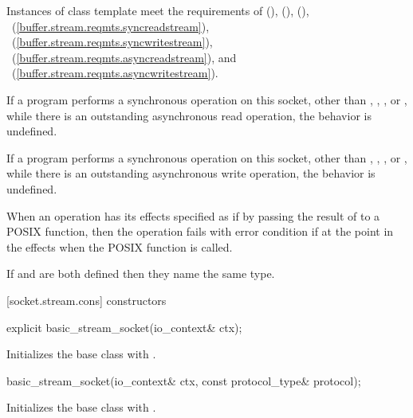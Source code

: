 \pnum
Instances of class template  meet the requirements of  (),  (),  (), ~(\ref{buffer.stream.reqmts.syncreadstream}), ~(\ref{buffer.stream.reqmts.syncwritestream}), ~(\ref{buffer.stream.reqmts.asyncreadstream}), and ~(\ref{buffer.stream.reqmts.asyncwritestream}).

\pnum
If a program performs a synchronous operation on this socket, other than , , , or , while there is an outstanding asynchronous read operation, the behavior is undefined.

\pnum
If a program performs a synchronous operation on this socket, other than , , , or , while there is an outstanding asynchronous write operation, the behavior is undefined.

\pnum
When an operation has its effects specified as if by passing the result of  to a POSIX function, then the operation fails with error condition  if  at the point in the effects when the POSIX function is called.

\pnum
If  and 
are both defined then they name the same type.


[socket.stream.cons]{ constructors}

\begin{itemdecl}
explicit basic_stream_socket(io_context& ctx);
\end{itemdecl}

\begin{itemdescr}
\pnum
\effects Initializes the base class with .
\end{itemdescr}

\begin{itemdecl}
basic_stream_socket(io_context& ctx, const protocol_type& protocol);
\end{itemdecl}

\begin{itemdescr}
\pnum
\effects Initializes the base class with .
\end{itemdescr}


